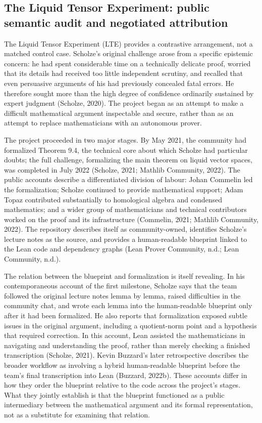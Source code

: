 \documentclass[pdflatex,sn-apa]{sn-jnl}
\begin{document}
\subsection{The Liquid Tensor Experiment: public semantic audit and negotiated attribution}

The Liquid Tensor Experiment (LTE) provides a contrastive arrangement, not a matched control case. Scholze's original challenge arose from a specific epistemic concern: he had spent considerable time on a technically delicate proof, worried that its details had received too little independent scrutiny, and recalled that even persuasive arguments of his had previously concealed fatal errors. He therefore sought more than the high degree of confidence ordinarily sustained by expert judgment (Scholze, 2020). The project began as an attempt to make a difficult mathematical argument inspectable and secure, rather than as an attempt to replace mathematicians with an autonomous prover.

The project proceeded in two major stages. By May 2021, the community had formalized Theorem 9.4, the technical core about which Scholze had particular doubts; the full challenge, formalizing the main theorem on liquid vector spaces, was completed in July 2022 (Scholze, 2021; Mathlib Community, 2022). The public accounts describe a differentiated division of labour: Johan Commelin led the formalization; Scholze continued to provide mathematical support; Adam Topaz contributed substantially to homological algebra and condensed mathematics; and a wider group of mathematicians and technical contributors worked on the proof and its infrastructure (Commelin, 2021; Mathlib Community, 2022). The repository describes itself as community-owned, identifies Scholze's lecture notes as the source, and provides a human-readable blueprint linked to the Lean code and dependency graphs (Lean Prover Community, n.d.; Lean Community, n.d.).

The relation between the blueprint and formalization is itself revealing. In his contemporaneous account of the first milestone, Scholze says that the team followed the original lecture notes lemma by lemma, raised difficulties in the community chat, and wrote each lemma into the human-readable blueprint only after it had been formalized. He also reports that formalization exposed subtle issues in the original argument, including a quotient-norm point and a hypothesis that required correction. In this account, Lean assisted the mathematicians in navigating and understanding the proof, rather than merely checking a finished transcription (Scholze, 2021). Kevin Buzzard's later retrospective describes the broader workflow as involving a hybrid human-readable blueprint before the team's final transcription into Lean (Buzzard, 2022b). These accounts differ in how they order the blueprint relative to the code across the project's stages. What they jointly establish is that the blueprint functioned as a public intermediary between the mathematical argument and its formal representation, not as a substitute for examining that relation.
\end{document}
